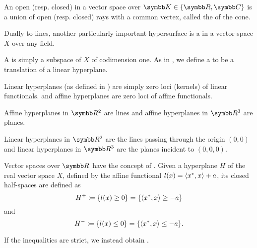 \begin{definition}\label{def:geometric_cone}
  An open (resp. closed)  in a vector space over \( \BK \in \{ \BR, \BC \} \) is a union of open (resp. closed) rays with a common vertex, called the  of the cone.
\end{definition}

\begin{definition}\label{def:hyperplane}
  Dually to lines, another particularly important hypersurface is a  in a vector space \( X \) over any field.

  \begin{defenum}
     A  is simply a subspace of \( X \) of codimension one. As in , we define a  to be a translation of a linear hyperplane.

     Linear hyperplanes (as defined in ) are simply zero loci (kernels) of linear functionals. and affine hyperplanes are zero loci of affine functionals.
  \end{defenum}
\end{definition}

\begin{example}\label{ex:hyperplanes}
  Affine hyperplanes in \( \BR^2 \) are lines and affine hyperplanes in \( \BR^3 \) are planes.

  Linear hyperplanes in \( \BR^2 \) are the lines passing through the origin \( (0, 0) \) and linear hyperplanes in \( \BR^3 \) are the planes incident to \( (0, 0, 0) \).
\end{example}

\begin{definition}\label{def:half_space}
  Vector spaces over \( \BR \) have the concept of . Given a hyperplane \( H \) of the real vector space \( X \), defined by the affine functional \( l(x) = \left\langle x^*, x \right\rangle + a \), its closed half-spaces are defined as
  \begin{equation*}
    H^+ \coloneqq \{ l(x) \geq 0 \} = \{ \left\langle x^*, x \right\rangle \geq -a \}
  \end{equation*}
  and
  \begin{equation*}
    H^- \coloneqq \{ l(x) \leq 0 \} = \{ \left\langle x^*, x \right\rangle \leq -a \}.
  \end{equation*}

  If the inequalities are strict, we instead obtain .
\end{definition}

